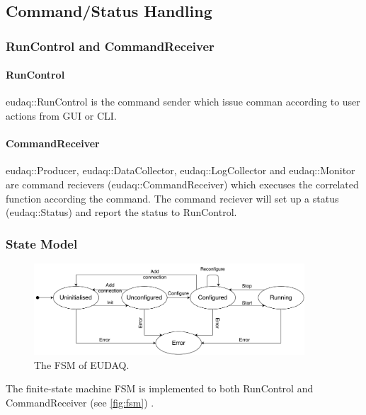 \subsection{Command/Status Handling}
\subsubsection{RunControl and CommandReceiver}\label{sec:fsm}
\paragraph{RunControl} eudaq::RunControl is the command sender which issue comman according to user actions from GUI or CLI.
\paragraph{CommandReceiver} eudaq::Producer, eudaq::DataCollector, eudaq::LogCollector and eudaq::Monitor are command recievers (eudaq::CommandReceiver) which execuses the correlated function according the command. The command reciever will set up a status (eudaq::Status) and report the status to RunControl.

\subsubsection{State Model}\label{sec:fsm}
\begin{figure}
\begin{center}
\includegraphics[width=0.9\textwidth]{src/images/fsmv2.pdf}
\end{center}
\caption{The FSM of EUDAQ.}
\label{fig:fsm}
\end{figure}

The finite-state machine \gls{FSM} is implemented to both RunControl and CommandReceiver (see \autoref{fig:fsm}) \cite{Shirokova:2016}. \\

